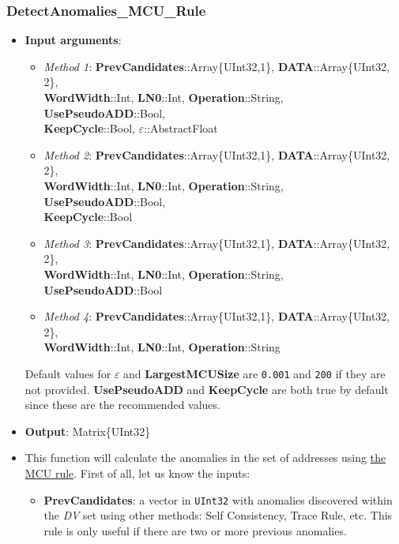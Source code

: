  \subsubsection*{DetectAnomalies\_MCU\_Rule}\label{Fun:DetectAnomaliesMCURule}
 \begin{itemize}
 	\item \textbf{Input arguments}: 
 	\begin{itemize}

 		\item \textit{Method 1}: \textbf{PrevCandidates}::Array\{UInt32,1\}, \textbf{DATA}::Array\{UInt32, 2\}, \\ \textbf{WordWidth}::Int, \textbf{LN0}::Int,  \textbf{Operation}::String, \textbf{UsePseudoADD}::Bool, \\ \textbf{KeepCycle}::Bool,  \textbf{\(\varepsilon\)}::AbstractFloat
 		\item \textit{Method 2}: 			%
 		\textbf{PrevCandidates}::Array\{UInt32,1\}, \textbf{DATA}::Array\{UInt32, 2\}, \\ \textbf{WordWidth}::Int, \textbf{LN0}::Int,  \textbf{Operation}::String, \textbf{UsePseudoADD}::Bool,\\ \textbf{KeepCycle}::Bool
 		\item \textit{Method 3}: 			%
 		\textbf{PrevCandidates}::Array\{UInt32,1\}, \textbf{DATA}::Array\{UInt32, 2\}, \\ \textbf{WordWidth}::Int, \textbf{LN0}::Int,  \textbf{Operation}::String, \textbf{UsePseudoADD}::Bool
 		\item \textit{Method 4}: 			%
 		\textbf{PrevCandidates}::Array\{UInt32,1\}, \textbf{DATA}::Array\{UInt32, 2\}, \\ \textbf{WordWidth}::Int, \textbf{LN0}::Int,  \textbf{Operation}::String
 	\end{itemize}
 	Default values for \textbf{\(\varepsilon\)} and \textbf{LargestMCUSize} are \texttt{0.001} and \texttt{200} if they are not provided.  \textbf{UsePseudoADD} and \textbf{KeepCycle} are both true by default since these are the recommended values.
 	\item \textbf{Output}: Matrix\{UInt32\}
 	\item This function will calculate the anomalies in the set of addresses using \hyperref[Subsec:MCURule]{the MCU rule}. 
 	First of all, let us know the inputs:
 	\begin{itemize}
 		
 		\item \textbf{PrevCandidates}: a vector in \texttt{UInt32} with anomalies discovered within the \textit{DV} set using other methods: Self Consistency, Trace Rule, etc. This rule is only useful if there are two or more previous anomalies. 
 		

\end{itemize}
\end{itemize}
